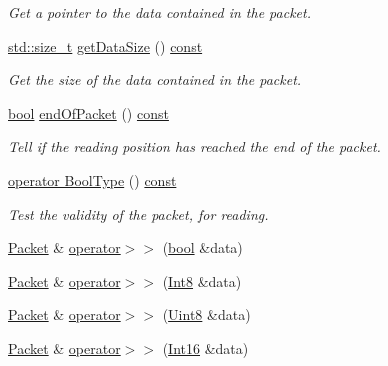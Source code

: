 \begin{DoxyCompactItemize}
\begin{DoxyCompactList}\small\item\em Get a pointer to the data contained in the packet. \end{DoxyCompactList}\item 
\hyperlink{nc__alloc_8h_a7b60c5629e55e8ec87a4547dd4abced4}{std\-::size\-\_\-t} \hyperlink{classsf_1_1_packet_a004b62aa5bafa69df8917171a3fe1fa0}{get\-Data\-Size} () \hyperlink{term__entry_8h_a57bd63ce7f9a353488880e3de6692d5a}{const} 
\begin{DoxyCompactList}\small\item\em Get the size of the data contained in the packet. \end{DoxyCompactList}\item 
\hyperlink{term__entry_8h_a002004ba5d663f149f6c38064926abac}{bool} \hyperlink{classsf_1_1_packet_aee3adfca6303f1e6bde3c62be392b945}{end\-Of\-Packet} () \hyperlink{term__entry_8h_a57bd63ce7f9a353488880e3de6692d5a}{const} 
\begin{DoxyCompactList}\small\item\em Tell if the reading position has reached the end of the packet. \end{DoxyCompactList}\item 
\hyperlink{classsf_1_1_packet_addcb990cde37859c748273d9de55e628}{operator Bool\-Type} () \hyperlink{term__entry_8h_a57bd63ce7f9a353488880e3de6692d5a}{const} 
\begin{DoxyCompactList}\small\item\em Test the validity of the packet, for reading. \end{DoxyCompactList}\item 
\hyperlink{classsf_1_1_packet}{Packet} \& \hyperlink{classsf_1_1_packet_af8e26c63ba9bdccd262565ff0d3eeba2}{operator$>$$>$} (\hyperlink{term__entry_8h_a002004ba5d663f149f6c38064926abac}{bool} \&data)
\item 
\hyperlink{classsf_1_1_packet}{Packet} \& \hyperlink{classsf_1_1_packet_a70fd5abb9095b5335b79c0cefd17b222}{operator$>$$>$} (\hyperlink{namespacesf_a69b109973eac74e22b97e5339bdb68dd}{Int8} \&data)
\item 
\hyperlink{classsf_1_1_packet}{Packet} \& \hyperlink{classsf_1_1_packet_aa67738284a7efc16c7594b358ef35510}{operator$>$$>$} (\hyperlink{namespacesf_a4ef3d630785c4f296f9b4f274c33d78e}{Uint8} \&data)
\item 
\hyperlink{classsf_1_1_packet}{Packet} \& \hyperlink{classsf_1_1_packet_af82d6c4e6d74f2ca39732c1e29f30781}{operator$>$$>$} (\hyperlink{namespacesf_a3c8e10435e2a310a7741755e66b5c94e}{Int16} \&data)

\end{DoxyCompactItemize}

